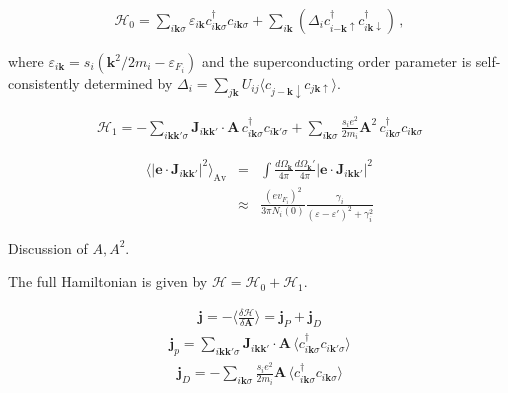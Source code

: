 \documentclass[a4paper]{article}
\begin{document}
\begin{eqnarray}
  \mathcal{H}_0 = \sum_{i\mathbf{k}\sigma}  
	\varepsilon_{i\mathbf{k}}c_{i\mathbf{k}\sigma}^\dagger
	c_{i\mathbf{k}\sigma} + \sum_{i\mathbf{k}}^{}
	\left( \Delta_i c_{i\mathbf{-k}\uparrow }^\dagger
	c_{i\mathbf{k}\downarrow }^\dagger  \right) \,,
\end{eqnarray}

where $\varepsilon_{i\mathbf{k}} = s_i \left(\mathbf{k}^2/2m_i -
\varepsilon_{F_i}\right)$ and the superconducting order parameter is self-consistently determined by 
$\Delta_i = \sum_{j\mathbf{k}}^{}U_{ij} \langle c_{j-\mathbf{k}\downarrow
}c_{j\mathbf{k}\uparrow }\rangle$.

\begin{eqnarray*}
	\mathcal{H}_1 = -\sum_{i\mathbf{kk'}\sigma}^{}
	\mathbf{J}_{i\mathbf{kk'}} \cdot \mathbf{A} \,
	c_{i\mathbf{k}\sigma}^\dagger  c_{i\mathbf{k}'\sigma} +
	\sum_{i\mathbf{k}\sigma}^{} \frac{s_i e^2}{2m_i} \mathbf{A}^2 \,
	c_{i\mathbf{k}\sigma}^\dagger c_{i\mathbf{k}\sigma}
\end{eqnarray*}

\begin{eqnarray*}
	\langle \left|\mathbf{e} \cdot
	\mathbf{J}_{i\mathbf{kk'}}\right|^2\rangle_{\text{Av}}
	&=& \int \frac{d\Omega_\mathbf{k}}{4\pi} \frac{d\Omega_\mathbf{k}'}{4\pi}
	\left|\mathbf{e} \cdot \mathbf{J}_{i\mathbf{kk'}}\right|^2
	\\
	&\approx& \frac{(e v_{F_i})^2}{3 \pi N_i(0)} 
	\frac{\gamma_i}{(\varepsilon-\varepsilon')^2 + \gamma_i^2}
\end{eqnarray*}

Discussion of $A, A^2$.

The full Hamiltonian is given by $\mathcal{H} = \mathcal{H}_0 +
\mathcal{H}_1$.

\begin{eqnarray*}
  \mathbf{j} = - \bigg\langle \frac{\delta\mathcal{H}}{\delta
  \mathbf{A}}\bigg\rangle = \mathbf{j}_P + \mathbf{j}_D
\end{eqnarray*}
\begin{eqnarray*}
  \mathbf{j}_p = \sum_{i\mathbf{kk'}\sigma}^{}
	\mathbf{J}_{i\mathbf{kk'}} \cdot \mathbf{A} \,
	\langle 
	c_{i\mathbf{k}\sigma}^\dagger  c_{i\mathbf{k}'\sigma}
	\rangle
\end{eqnarray*}
\begin{eqnarray*}
  \mathbf{j}_D = -\sum_{i\mathbf{k}\sigma}^{} \frac{s_i e^2}{2m_i} 
  \mathbf{A} \,
  \langle 
  c_{i\mathbf{k}\sigma}^\dagger c_{i\mathbf{k}\sigma}
  \rangle
\end{eqnarray*}
\end{document}
